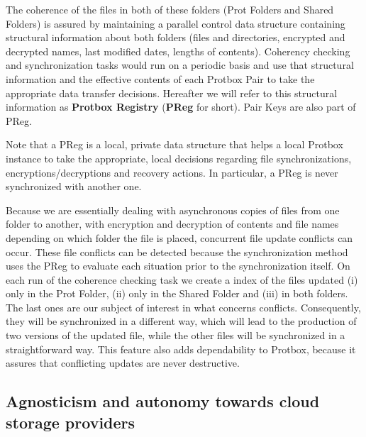 \documentclass[english]{lni}
\newcommand\protbox{Protbox}
\newcommand\ProtF{Prot Folder}
\newcommand\ProtFs{Prot Folders}
\newcommand\SharedF{Shared Folder}
\newcommand\SharedFs{Shared Folders}
\newcommand\PairKeys{Pair Keys}
\begin{document}
The coherence of the files in both of these folders ({\ProtFs}
and {\SharedFs}) is assured by maintaining a parallel
control data structure containing structural information about both
folders (files and directories, encrypted and decrypted names, last
modified dates, lengths of contents). Coherency checking and
synchronization tasks would run on a periodic basis and use that
structural information and the effective contents of each {\protbox}
Pair to take the appropriate data transfer decisions. Hereafter we
will refer to this structural information as \textbf{{\protbox}
Registry} (\textbf{PReg} for short). {\PairKeys} are also part of PReg.

Note that a PReg is a local, private data structure that helps
a local {\protbox} instance to take the appropriate, local
decisions regarding file synchronizations, encryptions/decryptions
and recovery actions. In particular, a PReg is never synchronized
with another one.

Because we are essentially dealing with asynchronous copies of files
from one folder to another, with encryption and decryption of
contents and file names depending on which folder the file is
placed, concurrent file update conflicts can occur. These file
conflicts can be detected because the synchronization method uses the
PReg to evaluate each situation prior to the synchronization itself.
On
each run of the coherence checking task we create a index of the
files updated (i) only in the {\ProtF}, (ii) only in the {\SharedF}
and (iii) in both folders. The last ones are our subject of
interest in what concerns conflicts. Consequently, they will be synchronized in a different way, which
will lead to the production of two versions of the updated file,
while the other files will be synchronized in a straightforward way.
This feature also adds dependability to {\protbox}, because it
assures that conflicting updates are never destructive.

\subsection{Agnosticism and autonomy towards cloud storage providers}
\end{document}

